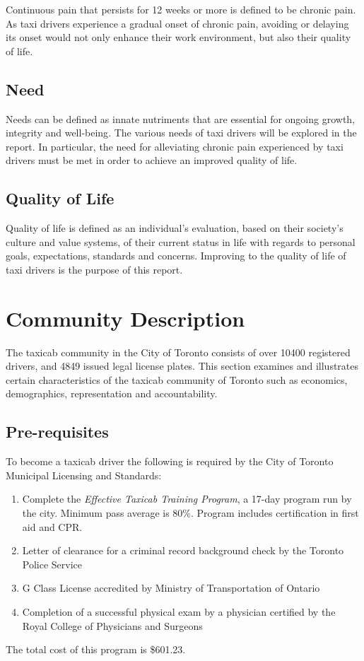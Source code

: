 \documentclass[11pt]{article}
\begin{document}
Continuous pain that persists for 12 weeks or more is defined to be
chronic pain\cite{chronic}. As taxi drivers experience a gradual onset of chronic
pain, avoiding or delaying its onset would not only enhance their work
environment, but also their quality of life.

\subsection{Need}
\label{sec:needs}
Needs can be defined as innate nutriments that are essential for 
ongoing growth, integrity and well-being\cite{deci2000and}. The 
various needs of taxi drivers will be explored in the report. In 
particular, the need for alleviating chronic pain experienced by 
taxi drivers must be met in order to achieve an improved quality 
of life. 

\subsection{Quality of Life}
\label{sec:lifequal}

Quality of life is defined as an individual's evaluation, based on
their society's culture and value systems, of their current status in
life with regards to personal goals, expectations, standards and
concerns\cite{WHO}. Improving to the quality of life of taxi drivers is the
purpose of this report.

\section{Community Description}
\label{sec:community}
The taxicab community in the City of Toronto consists of over 10400 registered drivers, 
and 4849 issued legal license plates. This section examines and 
illustrates certain characteristics of the taxicab community of Toronto such as economics, 
demographics, representation and accountability.

\subsection{Pre-requisites}
To become a taxicab driver the following is required by the City of Toronto Municipal Licensing and Standards:
\begin{enumerate}
\item Complete the \emph{Effective Taxicab Training Program}, a 17-day program run by the city. 
Minimum pass average is 80\%. Program includes certification in first aid and CPR.
\item Letter of clearance for a criminal record background check by the Toronto Police Service
\item G Class License accredited by Ministry of Transportation of Ontario 
\item Completion of a successful physical exam by a physician certified by the Royal College of Physicians and Surgeons 
\end{enumerate}
The total cost of this program is \$601.23\cite{MLS2013}.
\end{document}
